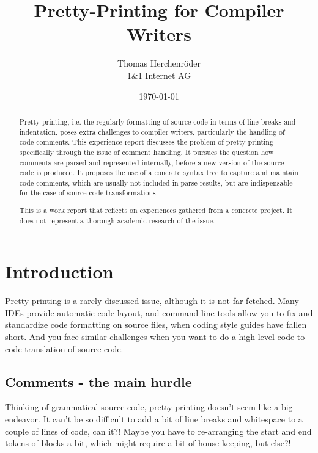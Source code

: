 \documentclass[11pt,a4paper]{article}
\begin{document}
\title{Pretty-Printing for Compiler Writers}
\author{
Thomas Herchenr\"oder\\
1\&1 Internet AG
}

\date{\today}
\maketitle

\begin{abstract} 

Pretty-printing, i.e. the regularly formatting of source code in terms of line
breaks and indentation, poses extra challenges to compiler writers, particularly
the handling of code comments. This experience report discusses the problem of
pretty-printing specifically through the issue of comment handling. It pursues
the question how comments are parsed and represented internally, before a new
version of the source code is produced. It proposes the use of a concrete syntax
tree to capture and maintain code comments, which are usually not included in
parse results, but are indispensable for the case of source code
transformations.

This is a work report that reflects on experiences gathered from a
concrete project. It does not represent a thorough academic research of the
issue.  

\end{abstract}

\section{Introduction} 

Pretty-printing is a rarely discussed issue, although it is not far-fetched.
Many IDEs provide automatic code layout, and command-line tools allow you to fix
and standardize code formatting on source files, when coding style guides have
fallen short. And you face similar challenges when you want to do a high-level
code-to-code translation of source code.

 
\subsection{Comments - the main hurdle}

Thinking of grammatical source code, pretty-printing doesn't seem like a big
endeavor. It can't be so difficult to add a bit of line breaks and whitespace to
a couple of lines of code, can it?! Maybe you have to re-arranging the start and
end tokens of blocks a bit, which might require a bit of house keeping, but else?!
\end{document}
